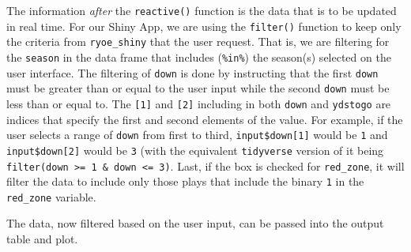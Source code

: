 \documentclass[
  letterpaper,
]{krantz}
\begin{document}
The information \emph{after} the \texttt{reactive()} function is the
data that is to be updated in real time. For our Shiny App, we are using
the \texttt{filter()} function to keep only the criteria from
\texttt{ryoe\_shiny} that the user request. That is, we are filtering
for the \texttt{season} in the data frame that includes
(\texttt{\%in\%}) the season(s) selected on the user interface. The
filtering of \texttt{down} is done by instructing that the first
\texttt{down} must be greater than or equal to the user input while the
second \texttt{down} must be less than or equal to. The \texttt{{[}1{]}}
and \texttt{{[}2{]}} including in both \texttt{down} and
\texttt{ydstogo} are indices that specify the first and second elements
of the value. For example, if the user selects a range of \texttt{down}
from first to third, \texttt{input\$down{[}1{]}} would be \texttt{1} and
\texttt{input\$down{[}2{]}} would be \texttt{3} (with the equivalent
\texttt{tidyverse} version of it being
\texttt{filter(down\ \textgreater{}=\ 1\ \&\ down\ \textless{}=\ 3)}.
Last, if the box is checked for \texttt{red\_zone}, it will filter the
data to include only those plays that include the binary \texttt{1} in
the \texttt{red\_zone} variable.

The data, now filtered based on the user input, can be passed into the
output table and plot.
\end{document}
